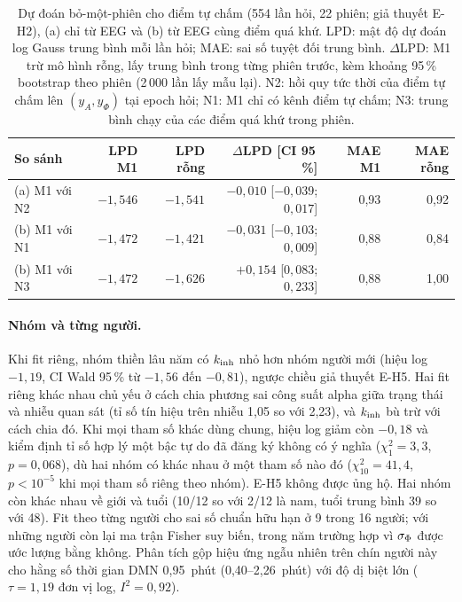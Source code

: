\begin{table}[t]
\centering\small
\caption{Dự đoán bỏ-một-phiên cho điểm tự chấm (554 lần hỏi, 22 phiên; giả thuyết E-H2), (a) chỉ từ EEG và (b) từ EEG cùng điểm quá khứ. LPD: mật độ dự đoán log Gauss trung bình mỗi lần hỏi; MAE: sai số tuyệt đối trung bình. $\Delta$LPD: M1 trừ mô hình rỗng, lấy trung bình trong từng phiên trước, kèm khoảng 95\,\% bootstrap theo phiên (2\,000 lần lấy mẫu lại). N2: hồi quy tức thời của điểm tự chấm lên $(y_A,y_\Phi)$ tại epoch hỏi; N1: M1 chỉ có kênh điểm tự chấm; N3: trung bình chạy của các điểm quá khứ trong phiên.}
\label{tab:real-loso}
\footnotesize\setlength{\tabcolsep}{4pt}
\begin{tabular}{lrrrrr}
\toprule
So sánh & LPD M1 & LPD rỗng & $\Delta$LPD [CI 95\,\%] & MAE M1 & MAE rỗng \\
\midrule
(a) M1 với N2 & $-1{,}546$ & $-1{,}541$ & $-0{,}010$ [$-0{,}039$; $0{,}017$] & 0,93 & 0,92 \\
(b) M1 với N1 & $-1{,}472$ & $-1{,}421$ & $-0{,}031$ [$-0{,}103$; $0{,}009$] & 0,88 & 0,84 \\
(b) M1 với N3 & $-1{,}472$ & $-1{,}626$ & $+0{,}154$ [$0{,}083$; $0{,}233$] & 0,88 & 1,00 \\
\bottomrule
\end{tabular}
\end{table}

\paragraph{Nhóm và từng người.} Khi fit riêng, nhóm thiền lâu năm có $k_{\mathrm{inh}}$ nhỏ hơn nhóm người mới (hiệu log $-1{,}19$, CI Wald 95\,\% từ $-1{,}56$ đến $-0{,}81$), ngược chiều giả thuyết E-H5. Hai fit riêng khác nhau chủ yếu ở cách chia phương sai công suất alpha giữa trạng thái và nhiễu quan sát (tỉ số tín hiệu trên nhiễu 1,05 so với 2,23), và $k_{\mathrm{inh}}$ bù trừ với cách chia đó. Khi mọi tham số khác dùng chung, hiệu log giảm còn $-0{,}18$ và kiểm định tỉ số hợp lý một bậc tự do đã đăng ký không có ý nghĩa ($\chi^2_1=3{,}3$, $p=0{,}068$), dù hai nhóm có khác nhau ở một tham số nào đó ($\chi^2_{10}=41{,}4$, $p<10^{-5}$ khi mọi tham số riêng theo nhóm). E-H5 không được ủng hộ. Hai nhóm còn khác nhau về giới và tuổi (10/12 so với 2/12 là nam, tuổi trung bình 39 so với 48). Fit theo từng người cho sai số chuẩn hữu hạn ở 9 trong 16 người; với những người còn lại ma trận Fisher suy biến, trong năm trường hợp vì $\sigma_{\Phi}$ được ước lượng bằng không. Phân tích gộp hiệu ứng ngẫu nhiên \citep{Viechtbauer2005} trên chín người này cho hằng số thời gian DMN 0,95~phút (0,40--2,26~phút) với độ dị biệt lớn ($\tau=1{,}19$ đơn vị log, $I^2=0{,}92$).

